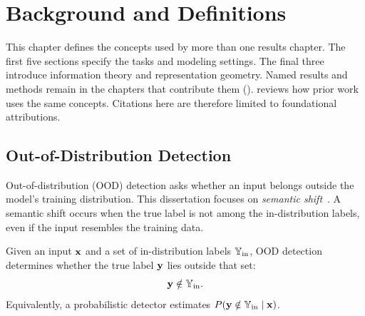 \chapter{Background and Definitions}
\label{ch:background}

This chapter defines the concepts used by more than one results chapter. The first
five sections specify the tasks and modeling settings. The final three introduce
information theory and representation geometry. Named results and methods remain
in the chapters that contribute them
().
 reviews how prior work uses the same concepts. Citations
here are therefore limited to foundational attributions.

\section{Out-of-Distribution Detection}
\label{sec:bg:ood}

Out-of-distribution (OOD) detection asks whether an input belongs outside the
model's training distribution. This dissertation focuses on \emph{semantic
shift}~\citep{yang2021generalized}. A semantic shift occurs when the true label is
not among the in-distribution labels, even if the input resembles the training
data.

\begin{definition}
Given an input ${\mathbf{x}}$ and a set of in-distribution labels ${\mathbb{Y}}_{\text{in}}$, OOD
detection determines whether the true label ${\mathbf{y}}$ lies outside that set:
\[
  {\mathbf{y}} \notin {\mathbb{Y}}_{\text{in}}.
\]
Equivalently, a probabilistic detector estimates
$P({\mathbf{y}} \notin {\mathbb{Y}}_{\text{in}} \mid {\mathbf{x}})$.
\label{def:bg:ood}
\end{definition}


